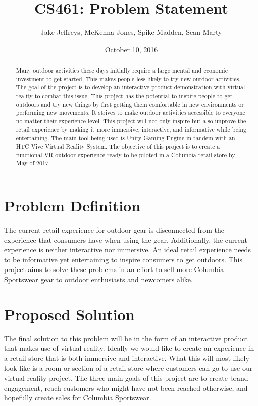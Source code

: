 \documentclass[10pt, oneside,onecolumn,draftclsnofoot]{IEEEtran}
\title{CS461: Problem Statement}
\author{Jake Jeffreys, McKenna Jones, Spike Madden, Sean Marty}
\date{October 10, 2016}
\begin{document}
\begin{titlepage}
\maketitle
\vspace{3cm}
\begin{abstract}
Many outdoor activities these days initially require a large mental and economic
investment to get started. This makes people less likely to try new outdoor
activities. The goal of the project is to develop an interactive product
demonstration with virtual reality to combat this issue. This project has the
potential to inspire people to get outdoors and try new things by first getting
them comfortable in new environments or performing new movements. It strives to
make outdoor activities accessible to everyone no matter their experience level.
This project will not only inspire but also improve the retail experience by
making it more immersive, interactive, and informative while being
entertaining. The main tool being used is Unity Gaming Engine in tandem with an
HTC Vive Virtual Reality System. The objective of this project is to create a
functional VR outdoor experience ready to be piloted in a Columbia retail store by
May of 2017.
\end{abstract}
\end{titlepage}

\section{Problem Definition}
The current retail experience for outdoor gear is disconnected from the
experience that consumers have when using the gear. Additionally, the current
experience is neither interactive nor immersive. An ideal retail experience
needs to be informative yet entertaining to inspire consumers to get outdoors.
This project aims to solve these problems in an effort to sell more Columbia
Sportswear gear to outdoor enthusiasts and newcomers alike.

\section{Proposed Solution}

The final solution to this problem will be in the form of an interactive
product that makes use of virtual reality. Ideally we would like to create an
experience in a retail store that is both immersive and interactive. What this
will most likely look like is a room or section of a retail store where
customers can go to use our virtual reality project. The three main goals of
this project are to create brand engagement, reach customers who might have not
been reached otherwise, and hopefully create sales for Columbia Sportswear.
\end{document}

